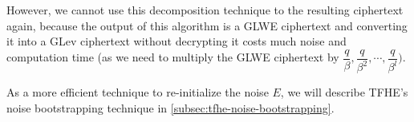 However, we cannot use this decomposition technique to the resulting ciphertext again, because the output of this algorithm is a GLWE ciphertext and converting it into a GLev ciphertext without decrypting it costs much noise and computation time (as we need to multiply the GLWE ciphertext by $\dfrac{q}{\beta}, \dfrac{q}{\beta^2}, \cdots, \dfrac{q}{\beta^l})$.  

As a more efficient technique to re-initialize the noise $E$, we will describe TFHE's noise bootstrapping technique in \autoref{subsec:tfhe-noise-bootstrapping}.
